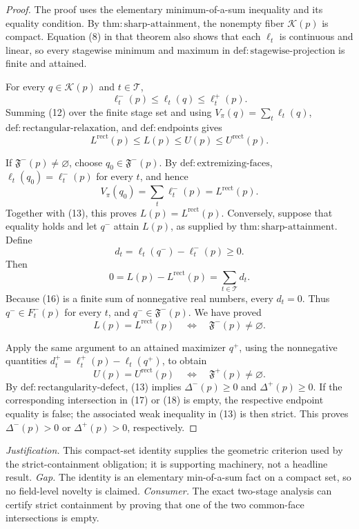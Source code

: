 \documentclass{article}
\begin{document}
\begin{proof}
The proof uses the elementary minimum-of-a-sum inequality and its equality condition.  By \(\mathrm{thm{:}sharp\text{-}attainment}\), the nonempty fiber \(\mathcal K(p)\) is compact.  Equation (8) in that theorem also shows that each \(\ell_t\) is continuous and linear, so every stagewise minimum and maximum in \(\mathrm{def{:}stagewise\text{-}projection}\) is finite and attained.

For every \(q\in\mathcal K(p)\) and \(t\in\mathcal T\),
\[
 \ell_t^-(p)\leq \ell_t(q)\leq \ell_t^+(p).
\tag{12}
\]
Summing (12) over the finite stage set and using \(V_\pi(q)=\sum_t\ell_t(q)\), \(\mathrm{def{:}rectangular\text{-}relaxation}\), and \(\mathrm{def{:}endpoints}\) gives
\[
 L^{\mathrm{rect}}(p)\leq L(p)\leq U(p)\leq U^{\mathrm{rect}}(p).
\tag{13}
\]

If \(\mathfrak F^-(p)\neq\varnothing\), choose \(q_0\in\mathfrak F^-(p)\).  By \(\mathrm{def{:}extremizing\text{-}faces}\), \(\ell_t(q_0)=\ell_t^-(p)\) for every \(t\), and hence
\[
 V_\pi(q_0)=\sum_t\ell_t^-(p)=L^{\mathrm{rect}}(p).
\tag{14}
\]
Together with (13), this proves \(L(p)=L^{\mathrm{rect}}(p)\).  Conversely, suppose that equality holds and let \(q^-\) attain \(L(p)\), as supplied by \(\mathrm{thm{:}sharp\text{-}attainment}\).  Define
\[
 d_t=\ell_t(q^-)-\ell_t^-(p)\geq0.
\tag{15}
\]
Then
\[
 0=L(p)-L^{\mathrm{rect}}(p)=\sum_{t\in\mathcal T}d_t.
\tag{16}
\]
Because (16) is a finite sum of nonnegative real numbers, every \(d_t=0\).  Thus \(q^-\in F_t^-(p)\) for every \(t\), and \(q^-\in\mathfrak F^-(p)\).  We have proved
\[
 L(p)=L^{\mathrm{rect}}(p)
 \quad\Longleftrightarrow\quad
 \mathfrak F^-(p)\neq\varnothing.
\tag{17}
\]

Apply the same argument to an attained maximizer \(q^+\), using the nonnegative quantities \(d_t^+=\ell_t^+(p)-\ell_t(q^+)\), to obtain
\[
 U(p)=U^{\mathrm{rect}}(p)
 \quad\Longleftrightarrow\quad
 \mathfrak F^+(p)\neq\varnothing.
\tag{18}
\]
By \(\mathrm{def{:}rectangularity\text{-}defect}\), (13) implies \(\Delta^-(p)\geq0\) and \(\Delta^+(p)\geq0\).  If the corresponding intersection in (17) or (18) is empty, the respective endpoint equality is false; the associated weak inequality in (13) is then strict.  This proves \(\Delta^-(p)>0\) or \(\Delta^+(p)>0\), respectively.
\end{proof}
\par\smallskip\noindent \textit{Justification.} This compact-set identity supplies the geometric criterion used by the strict-containment obligation; it is supporting machinery, not a headline result. \textit{Gap.} The identity is an elementary min-of-a-sum fact on a compact set, so no field-level novelty is claimed. \textit{Consumer.} The exact two-stage analysis can certify strict containment by proving that one of the two common-face intersections is empty.
\end{document}
